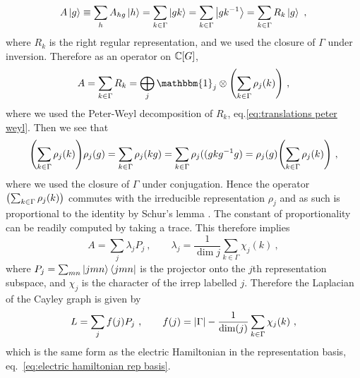 \begin{equation}
    A \ket{g} \equiv \sum_h A_{hg} \ket{h} = \sum_{k \in \Gamma} \ket{gk} = \sum_{k \in \Gamma} \ket{gk^{-1}} = \sum_{k \in \Gamma} R_k \ket{g} \ ,
\end{equation}
where $R_k$ is the right regular representation, and we used the closure of $\Gamma$ under inversion.
Therefore as an operator on $\mathbb{C}[G]$,
\begin{equation}
    A = \sum_{k \in \Gamma} R_k = \bigoplus_j \mathbbm{1}_j \otimes \pqty{\sum_{k \in \Gamma} \rho_j(k)} \ ,
\end{equation}
where we used the Peter-Weyl decomposition of $R_k$, eq.\eqref{eq:translations peter weyl}.
Then we see that
\begin{equation}
    \pqty{\sum_{k \in \Gamma} \rho_j(k)} \rho_j(g) = \sum_{k \in \Gamma} \rho_j(kg) = \sum_{k \in \Gamma} \rho_j((g k g^{-1} g) = \rho_j(g) \pqty{\sum_{k \in \Gamma} \rho_j(k)} \ ,
\end{equation}
where we used the closure of $\Gamma$ under conjugation.
Hence the operator $\pqty{\sum_{k \in \Gamma} \rho_j(k)}$ commutes with the irreducible representation $\rho_j$ and as such is proportional to the identity by Schur's lemma \cite{Serre}.
The constant of proportionality can be readily computed by taking a trace.
This therefore implies
\begin{equation}
    A = \sum_j \lambda_j P_j \ , \quad \quad \lambda_j = \frac{1}{\dim{j}} \sum_{k \in \Gamma} \chi_j(k) \ ,
\end{equation}
where $P_j = \sum_{mn} \ket{jmn}\bra{jmn}$ is the projector onto the $j$th representation subspace, and $\chi_j$ is the character of the irrep labelled $j$.
Therefore the Laplacian of the Cayley graph is given by
\begin{equation}\label{eq:laplacian finite group}
    L = \sum_j f(j) P_j \ , \quad \quad f(j)= \abs{\Gamma}-\frac{1}{\mathrm{dim}(j)} \sum_{k \in \Gamma} \chi_j(k) \ ,
\end{equation}
which is the same form as the electric Hamiltonian in the representation basis, eq.~\eqref{eq:electric hamiltonian rep basis}.

